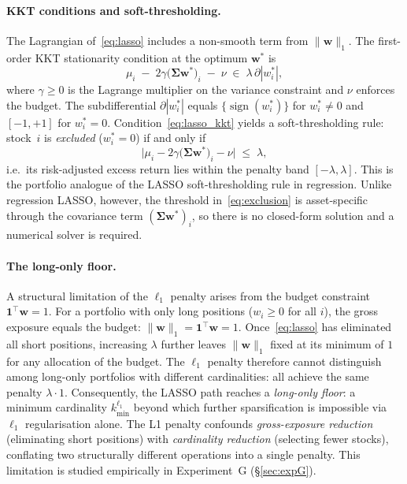 \documentclass[11pt]{article}
\begin{document}
\paragraph{KKT conditions and soft-thresholding.}
The Lagrangian of~\eqref{eq:lasso} includes a non-smooth term from $\|\mathbf{w}\|_1$.
The first-order KKT stationarity condition at the optimum $\mathbf{w}^*$ is
\begin{equation}
  \mu_i \;-\; 2\gamma\bigl(\boldsymbol{\Sigma}\mathbf{w}^*\bigr)_i \;-\; \nu
  \;\in\; \lambda\,\partial|w_i^*|,
  \label{eq:lasso_kkt}
\end{equation}
where $\gamma\geq 0$ is the Lagrange multiplier on the variance constraint and $\nu$
enforces the budget.  The subdifferential $\partial|w_i^*|$ equals $\{\operatorname{sign}(w_i^*)\}$ for
$w_i^*\neq 0$ and $[-1,+1]$ for $w_i^*=0$.  Condition~\eqref{eq:lasso_kkt} yields
a soft-thresholding rule: stock~$i$ is \emph{excluded} ($w_i^*=0$) if and only if
\begin{equation}
  \bigl|\mu_i - 2\gamma\bigl(\boldsymbol{\Sigma}\mathbf{w}^*\bigr)_i - \nu\bigr|
  \;\leq\; \lambda,
  \label{eq:exclusion}
\end{equation}
i.e.\ its risk-adjusted excess return lies within the penalty band $[-\lambda,\lambda]$.
This is the portfolio analogue of the LASSO soft-thresholding rule in regression.
Unlike regression LASSO, however, the threshold in~\eqref{eq:exclusion} is
asset-specific through the covariance term $(\boldsymbol{\Sigma}\mathbf{w}^*)_i$,
so there is no closed-form solution and a numerical solver is required.

\paragraph{The long-only floor.}
A structural limitation of the $\ell_1$ penalty arises from the budget constraint
$\mathbf{1}^\top\mathbf{w}=1$.  For a portfolio with only long positions
($w_i\geq 0$ for all $i$), the gross exposure equals the budget:
$\|\mathbf{w}\|_1=\mathbf{1}^\top\mathbf{w}=1$.  Once~\eqref{eq:lasso} has
eliminated all short positions, increasing $\lambda$ further leaves $\|\mathbf{w}\|_1$
fixed at its minimum of $1$ for any allocation of the budget.  The $\ell_1$
penalty therefore cannot distinguish among long-only portfolios with different
cardinalities: all achieve the same penalty $\lambda\cdot 1$.  Consequently,
the LASSO path reaches a \emph{long-only floor}: a minimum cardinality
$k_{\min}^{\ell_1}$ beyond which further sparsification is impossible via $\ell_1$
regularisation alone.  The L1 penalty confounds \emph{gross-exposure reduction}
(eliminating short positions) with \emph{cardinality reduction} (selecting fewer
stocks), conflating two structurally different operations into a single penalty.
This limitation is studied empirically in Experiment~G (\S\ref{sec:expG}).
\end{document}
